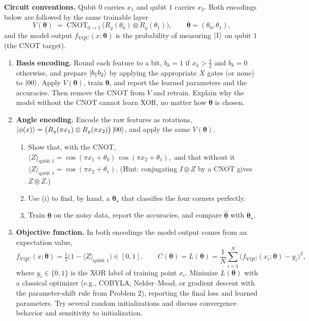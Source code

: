 \documentclass[11pt]{article}
\begin{document}
\medskip
\noindent\textbf{Circuit conventions.} Qubit $0$ carries $x_1$ and qubit $1$ carries $x_2$. Both encodings below are followed by the same trainable layer
\[
V(\boldsymbol{\theta}) \;=\; \mathrm{CNOT}_{0\to1}\,\big(R_y(\theta_0)\otimes R_y(\theta_1)\big),
\qquad \boldsymbol{\theta}=(\theta_0,\theta_1),
\]
and the model output $f_{\text{VQC}}(x;\boldsymbol{\theta})$ is the probability of measuring $\ket{1}$ on qubit $1$ (the CNOT target).

\begin{enumerate}[label=(\alph*)]
\item \textbf{Basis encoding.}
Round each feature to a bit, $b_k = 1$ if $x_k>\tfrac12$ and $b_k=0$ otherwise, and prepare $\ket{b_1b_2}$ by applying the appropriate $X$ gates (or none) to $\ket{00}$. Apply $V(\boldsymbol{\theta})$, train $\boldsymbol{\theta}$, and report the learned parameters and the accuracies. Then remove the CNOT from $V$ and retrain. Explain why the model without the CNOT cannot learn XOR, no matter how $\boldsymbol{\theta}$ is chosen.

\item \textbf{Angle encoding.}
Encode the raw features as rotations, $\ket{\phi(x)} = \big(R_y(\pi x_1)\otimes R_y(\pi x_2)\big)\ket{00}$, and apply the same $V(\boldsymbol{\theta})$.
\begin{enumerate}[label=(\roman*)]
\item Show that, with the CNOT,
\(
\langle Z\rangle_{\text{qubit }1} = \cos(\pi x_1+\theta_0)\,\cos(\pi x_2+\theta_1),
\)
and that without it $\langle Z\rangle_{\text{qubit }1} = \cos(\pi x_2+\theta_1)$. (Hint: conjugating $I\otimes Z$ by a CNOT gives $Z\otimes Z$.)
\item Use (i) to find, by hand, a $\boldsymbol{\theta}_\star$ that classifies the four corners perfectly.
\item Train $\boldsymbol{\theta}$ on the noisy data, report the accuracies, and compare $\hat{\boldsymbol{\theta}}$ with $\boldsymbol{\theta}_\star$.
\end{enumerate}

\item \textbf{Objective function.} In both encodings the model output comes from an expectation value,
\[
f_{\text{VQC}}(x;\boldsymbol{\theta}) = \tfrac{1}{2}\big(1-\langle Z\rangle_{\text{qubit }1}\big)\in[0,1],
\qquad
C(\boldsymbol{\theta}) = L(\boldsymbol{\theta}) = \frac{1}{N}\sum_{i=1}^{N} \big(f_{\text{VQC}}(x_i;\boldsymbol{\theta}) - y_i\big)^2,
\]
where $y_i\in\{0,1\}$ is the XOR label of training point $x_i$. Minimize $L(\boldsymbol{\theta})$ with a classical optimizer (e.g., COBYLA, Nelder–Mead, or gradient descent with the parameter-shift rule from Problem 2), reporting the final loss and learned parameters. Try several random initializations and discuss convergence behavior and sensitivity to initialization.


\end{enumerate}
\end{document}
